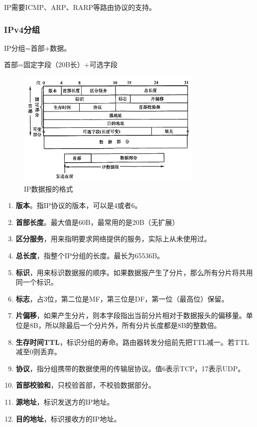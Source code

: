 \documentclass[12pt, a4paper, oneside]{ctexart}
\begin{document}
IP需要ICMP、ARP、RARP等路由协议的支持。

\subsubsection{IPv4分组}

IP分组=首部+数据。

首部=固定字段（20B长）+可选字段

\begin{figure}
    \centering
    \includegraphics[width=0.8\textwidth]{./images/ip_datagram.png}
    \caption{IP数据报的格式}
\end{figure}

\begin{enumerate}
    \item {\bf 版本}。指IP协议的版本，可以是4或者6。
    \item {\bf 首部长度}。最大值是60B，最常用的是20B（无扩展）
    \item {\bf 区分服务}，用来指明要求网络提供的服务，实际上从未使用过。
    \item {\bf 总长度}，指整个IP分组的长度。最长为65536B。
    \item {\bf 标识}，用来标识数据报的顺序。如果数据报产生了分片，那么所有分片将共用同一个标识。
    \item {\bf 标志}，占3位，第二位是MF，第三位是DF，第一位（最高位）保留。
    \item {\bf 片偏移}，如果产生分片，则本字段指出当前分片相对于数据报头的偏移量。单位是8B，所以除最后一个分片外，所有分片长度都是8B的整数倍。
    \item {\bf 生存时间TTL}，标识分组的寿命。路由器转发分组前先把TTL减一。若TTL减至0则丢弃。
    \item {\bf 协议}，指分组携带的数据使用的传输层协议。值6表示TCP，17表示UDP。
    \item {\bf 首部校验和}，只校验首部，不校验数据部分。
    \item {\bf 源地址}，标识发送方的IP地址。
    \item {\bf 目的地址}，标识接收方的IP地址。
\end{enumerate}
\end{document}
